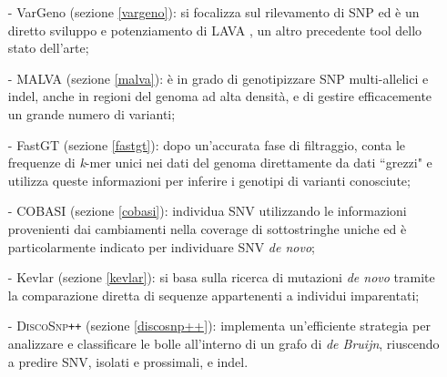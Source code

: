 \documentclass[../main.tex]{subfiles}
\begin{document}
\begin{itemize} 
\item[-] VarGeno (sezione \ref{vargeno}): \cite{sun-medvedev2018vargeno} si focalizza sul rilevamento di SNP ed è un diretto sviluppo e potenziamento di LAVA \cite{shajii2016lava}, un altro precedente tool dello stato dell'arte;
\item[-] MALVA (sezione \ref{malva}): \cite{bernardini2019malva} è in grado di genotipizzare SNP multi-allelici e indel, anche in regioni del genoma ad alta densità, e di gestire efficacemente un grande numero di varianti;
\item[-] FastGT (sezione \ref{fastgt}): \cite{pajuste2017fastgt} dopo un'accurata fase di filtraggio, conta le frequenze di \textit{k}-mer unici nei dati del genoma direttamente da dati ``grezzi" e utilizza queste informazioni per inferire i genotipi di varianti conosciute;
\item[-] COBASI (sezione \ref{cobasi}): \cite{gomez-romero2018cobasi} individua SNV utilizzando le informazioni provenienti dai cambiamenti nella coverage di sottostringhe uniche ed è particolarmente indicato per individuare SNV \textit{de novo};
\item[-] Kevlar (sezione \ref{kevlar}): \cite{standage2019kevlar} si basa sulla ricerca di mutazioni \textit{de novo} tramite la comparazione diretta di sequenze appartenenti a individui imparentati;
\item[-] \textsc{DiscoSnp}\texttt{++} (sezione \ref{discosnp++}): \cite{peterlongo2017discosnp++} implementa un'efficiente strategia per analizzare e classificare le bolle all'interno di un grafo di \textit{de Bruijn}, riuscendo a predire SNV, isolati e prossimali, e indel.
\end{itemize} 
\end{document}
